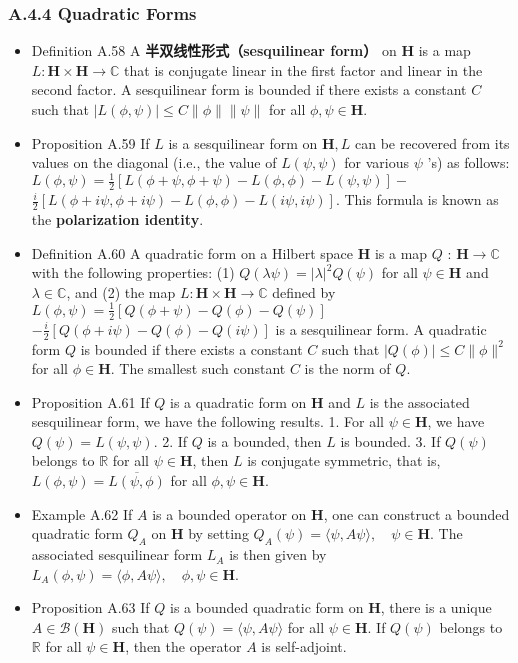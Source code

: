 \subsubsection{A.4.4 Quadratic Forms}

\begin{itemize}
\item Definition A.58 A \textbf{半双线性形式（sesquilinear form）} on $\mathbf{H}$ is a map $L: \mathbf{H} \times \mathbf{H} \rightarrow \mathbb{C}$ that is conjugate linear in the first factor and linear in the second factor. A sesquilinear form is bounded if there exists a constant $C$ such that $|L(\phi, \psi)| \leq C\|\phi\|\|\psi\|$ for all $\phi, \psi \in \mathbf{H}$.

\item Proposition A.59 If $L$ is a sesquilinear form on $\mathbf{H}, L$ can be recovered from its values on the diagonal (i.e., the value of $L(\psi, \psi)$ for various $\psi$ 's) as follows: $L(\phi, \psi) =\frac{1}{2}[L(\phi+\psi, \phi+\psi)-L(\phi, \phi)-L(\psi, \psi)]
-$ $\frac{i}{2}[L(\phi+i \psi, \phi+i \psi)-L(\phi, \phi)-L(i \psi, i \psi)]$. This formula is known as the \textbf{polarization identity}.

\item Definition A.60 A quadratic form on a Hilbert space $\mathbf{H}$ is a map $Q$ : $\mathbf{H} \rightarrow \mathbb{C}$ with the following properties: (1) $Q(\lambda \psi)=|\lambda|^{2} Q(\psi)$ for all $\psi \in \mathbf{H}$ and $\lambda \in \mathbb{C}$, and (2) the map $L: \mathbf{H} \times \mathbf{H} \rightarrow \mathbb{C}$ defined by $L(\phi, \psi) =\frac{1}{2}[Q(\phi+\psi)-Q(\phi)-Q(\psi)]$ $-\frac{i}{2}[Q(\phi+i \psi)-Q(\phi)-Q(i \psi)]$ is a sesquilinear form. A quadratic form $Q$ is bounded if there exists a constant $C$ such that $|Q(\phi)| \leq C\|\phi\|^{2}$ for all $\phi \in \mathbf{H}$. The smallest such constant $C$ is the norm of $Q$.

\item Proposition A.61 If $Q$ is a quadratic form on $\mathbf{H}$ and $L$ is the associated sesquilinear form, we have the following results.
1. For all $\psi \in \mathbf{H}$, we have $Q(\psi)=L(\psi, \psi)$.
2. If $Q$ is a bounded, then $L$ is bounded.
3. If $Q(\psi)$ belongs to $\mathbb{R}$ for all $\psi \in \mathbf{H}$, then $L$ is conjugate symmetric, that is, $L(\phi, \psi)=\overline{L(\psi, \phi)}$ for all $\phi, \psi \in \mathbf{H}$.

\item Example A.62 If $A$ is a bounded operator on $\mathbf{H}$, one can construct a bounded quadratic form $Q_{A}$ on $\mathbf{H}$ by setting $Q_{A}(\psi)=\langle\psi, A \psi\rangle, \quad \psi \in \mathbf{H}$. The associated sesquilinear form $L_{A}$ is then given by $L_{A}(\phi, \psi)=\langle\phi, A \psi\rangle, \quad \phi, \psi \in \mathbf{H}$.

\item Proposition A.63 If $Q$ is a bounded quadratic form on $\mathbf{H}$, there is a unique $A \in \mathcal{B}(\mathbf{H})$ such that $Q(\psi)=\langle\psi, A \psi\rangle$ for all $\psi \in \mathbf{H}$. If $Q(\psi)$ belongs to $\mathbb{R}$ for all $\psi \in \mathbf{H}$, then the operator $A$ is self-adjoint.
\end{itemize}

